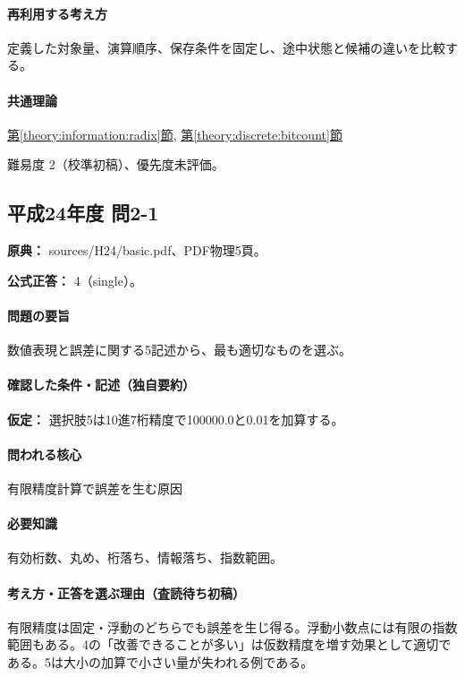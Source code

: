 \paragraph{再利用する考え方} 定義した対象量、演算順序、保存条件を固定し、途中状態と候補の違いを比較する。

\paragraph{共通理論} \hyperref[theory:information:radix]{第\ref*{theory:information:radix}節}, \hyperref[theory:discrete:bitcount]{第\ref*{theory:discrete:bitcount}節}

\par 難易度 2（校準初稿）、優先度未評価。

\subsection{平成24年度 問2-1}
\label{q:h24-reg-basic-2-1}

\noindent\textbf{原典：} sources/H24/basic.pdf、PDF物理5頁。

\textbf{公式正答：} 4（single）。

\paragraph{問題の要旨} 数値表現と誤差に関する5記述から、最も適切なものを選ぶ。

\paragraph{確認した条件・記述（独自要約）}\mbox{}\par

\noindent\textbf{仮定：} 選択肢5は10進7桁精度で100000.0と0.01を加算する。\par

\paragraph{問われる核心} 有限精度計算で誤差を生む原因

\paragraph{必要知識} 有効桁数、丸め、桁落ち、情報落ち、指数範囲。

\paragraph{考え方・正答を選ぶ理由（査読待ち初稿）} 有限精度は固定・浮動のどちらでも誤差を生じ得る。浮動小数点には有限の指数範囲もある。4の「改善できることが多い」は仮数精度を増す効果として適切である。5は大小の加算で小さい量が失われる例である。


